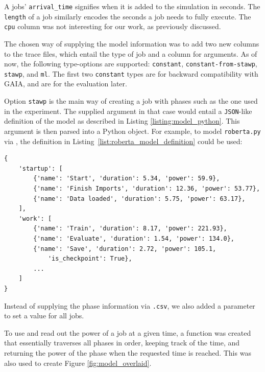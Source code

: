 A jobs' \verb|arrival_time| signifies when it is added to the simulation in seconds. 
The \verb|length| of a job similarly encodes the seconds a job needs to fully execute. The \verb|cpu| column was not interesting for our work, as previously discussed.

The chosen way of supplying the model information was to add two new columns to the trace files, which entail the type of job and a column for arguments. 
As of now, the following type-options are supported: \verb|constant|, \verb|constant-from-stawp|, \verb|stawp|, and \verb|ml|. 
The first two \verb|constant| types are for backward compatibility with GAIA, and are for the evaluation later.

Option \verb|stawp| is the main way of creating a job with phases such as the one used in the experiment. The supplied argument in that case would entail a \verb|JSON|-like definition of the model as described in Listing \ref{listing:model_python}.
This argument is then parsed into a Python object.
For example, to model \verb|roberta.py| via \modelname{}, the definition in Listing~\ref{list:roberta_model_definition} could be used:

\begin{minipage}{\linewidth}
\begin{lstlisting}[frame=single, numbers=none, caption={Simplified definition for a job similar to the experiment}, label={list:roberta_model_definition}, basicstyle=\ttfamily]
{
    'startup': [
        {'name': 'Start', 'duration': 5.34, 'power': 59.9},
        {'name': 'Finish Imports', 'duration': 12.36, 'power': 53.77},
        {'name': 'Data loaded', 'duration': 5.75, 'power': 63.17}, 
    ],
    'work': [
        {'name': 'Train', 'duration': 8.17, 'power': 221.93}, 
        {'name': 'Evaluate', 'duration': 1.54, 'power': 134.0}, 
        {'name': 'Save', 'duration': 2.72, 'power': 105.1,
            'is_checkpoint': True}, 
        ...
    ] 
}
\end{lstlisting}
\end{minipage}

Instead of supplying the phase information via \verb|.csv|, we also added a parameter to set a value for all jobs.

To use \modelname{} and read out the power of a job at a given time, a function was created that essentially traverses all phases in order, keeping track of the time, and returning the power of the phase when the requested time is reached. 
This was also used to create Figure \ref{fig:model_overlaid}.

